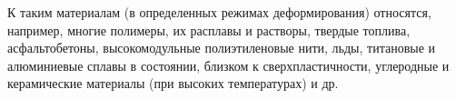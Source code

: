  К таким материалам (в определенных режимах деформирования) относятся, например, многие полимеры, их расплавы и растворы, твердые топлива, асфальтобетоны, высокомодульные полиэтиленовые нити, льды, титановые и алюминиевые сплавы в состоянии, близком к сверхпластичности, углеродные и керамические материалы (при высоких температурах) и др. 












\vspace{-2mm}



